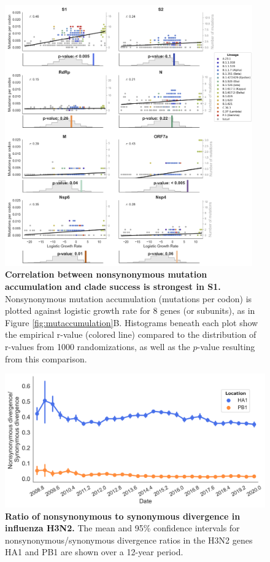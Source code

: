 \documentclass[11pt,oneside,letterpaper]{article}
\begin{document}
\begin{figure}[h!]
	\centerline{\includegraphics[width=0.95\textwidth]{fig1_supp_mutaccummoregenes.png}}
	\caption{\textbf{Correlation between nonsynonymous mutation accumulation and clade success is strongest in S1.}
	Nonsynonymous mutation accumulation (mutations per codon) is plotted against logistic growth rate for 8 genes (or subunits), as in Figure \ref{fig:mutaccumulation}B. Histograms beneath each plot show the empirical r-value (colored line) compared to the distribution of r-values from 1000 randomizations, as well as the $p$-value resulting from this comparison.
	}
	\label{fig:mutaccummoregenes}
\end{figure}

\begin{figure}[h!]
	\centerline{\includegraphics[scale=0.55]{fig2_supp_h3n2dnds.png}}
	\caption{\textbf{Ratio of nonsynonymous to synonymous divergence in influenza H3N2.}
	The mean and 95\% confidence intervals for nonsynonymous/synonymous divergence ratios in the H3N2 genes HA1 and PB1 are shown over a 12-year period.
	}
	\label{fig:fig2_h3n2dnds}
\end{figure}
\end{document}
